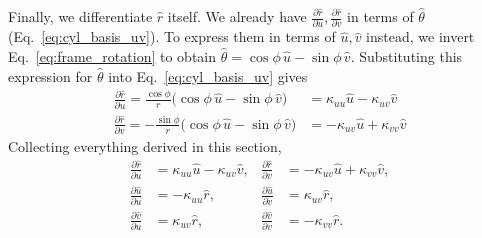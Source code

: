 \documentclass[11pt]{article}
\begin{document}
Finally, we differentiate $\hat r$ itself. We already have $\frac{\partial\hat r}{\partial u},\frac{\partial\hat r}{\partial v}$ in terms of $\hat\theta$ (Eq.~\ref{eq:cyl_basis_uv}). To express them in terms of $\hat u,\hat v$ instead, we invert Eq.~\eqref{eq:frame_rotation} to obtain $\hat\theta=\cos\phi\,\hat u-\sin\phi\,\hat v$. Substituting this expression for $\hat \theta$ into Eq.~\eqref{eq:cyl_basis_uv} gives
\begin{align}
    \frac{\partial\hat r}{\partial u} = \frac{\cos\phi}{r}\big(\cos\phi\,\hat u-\sin\phi\,\hat v\big) &= \kappa_{uu}\hat u-\kappa_{uv}\hat v\\
    \frac{\partial\hat r}{\partial v} = -\frac{\sin\phi}{r}\big(\cos\phi\,\hat u-\sin\phi\,\hat v\big) &= -\kappa_{uv}\hat u+\kappa_{vv}\hat v
\end{align}
Collecting everything derived in this section,
\begin{equation}\label{eq:frame_rotation_rates}
    \begin{aligned}
    \frac{\partial\hat r}{\partial u} &= \kappa_{uu}\hat u - \kappa_{uv}\hat v, &
    \frac{\partial\hat r}{\partial v} &= -\kappa_{uv}\hat u + \kappa_{vv}\hat v, \\
    \frac{\partial\hat u}{\partial u} &= -\kappa_{uu}\hat r, &
    \frac{\partial\hat u}{\partial v} &= \kappa_{uv}\hat r, \\
    \frac{\partial\hat v}{\partial u} &= \kappa_{uv}\hat r, &
    \frac{\partial\hat v}{\partial v} &= -\kappa_{vv}\hat r.
    \end{aligned}
\end{equation}
\end{document}
